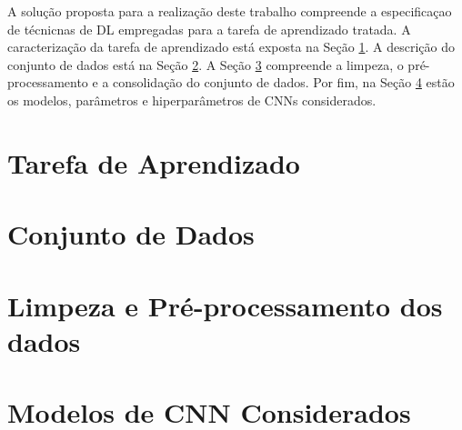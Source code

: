 A solução proposta para a realização deste trabalho compreende a especificaçao de técnicnas de DL empregadas para a tarefa de aprendizado tratada. A caracterização da tarefa de aprendizado está exposta na Seção \ref{subsec:tarefa}. A descrição do conjunto de dados está na Seção \ref{subsec:dataset}. A Seção \ref{subsec:limpeza} compreende a limpeza, o pré-processamento e a consolidação do conjunto de dados. Por fim, na Seção \ref{subsec:modelos} estão os modelos, parâmetros e hiperparâmetros de CNNs considerados.

\section{Tarefa de Aprendizado}\label{subsec:tarefa}


\section{Conjunto de Dados}\label{subsec:dataset}


\section{Limpeza e Pré-processamento dos dados}\label{subsec:limpeza}


\section{Modelos de CNN Considerados} \label{subsec:modelos}

